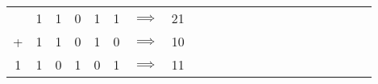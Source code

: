 \documentclass[12pt]{article}
\begin{document}
\begin{enumerate}
\begin{enumerate}
                    \smallskip
                    \smallskip
                    \smallskip
                    \smallskip

        \begin{tabular}{cccccccccccccccccccccc}
           & 1 & 1 & 0 & 1 & 1 & $\implies$ & 21\\
          + & 1 & 1 & 0 & 1 & 0  & $\implies$ & 10\\
        \hline
          1 & 1 & 0 & 1 & 0 & 1 & $\implies$ & 11 \\
        \end{tabular}
            
\end{enumerate}

     

\end{enumerate}
\end{document}
